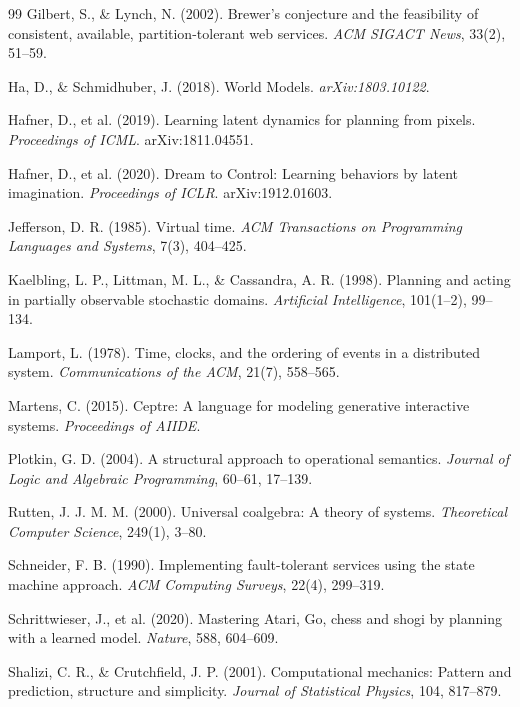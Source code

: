\documentclass[11pt]{article}
\begin{document}
\begin{thebibliography}{99}
 Gilbert, S., \& Lynch, N. (2002). Brewer's conjecture and the feasibility of consistent, available, partition-tolerant web services. \textit{ACM SIGACT News}, 33(2), 51--59.

 Ha, D., \& Schmidhuber, J. (2018). World Models. \textit{arXiv:1803.10122}.

 Hafner, D., et al. (2019). Learning latent dynamics for planning from pixels. \textit{Proceedings of ICML}. arXiv:1811.04551.

 Hafner, D., et al. (2020). Dream to Control: Learning behaviors by latent imagination. \textit{Proceedings of ICLR}. arXiv:1912.01603.

 Jefferson, D. R. (1985). Virtual time. \textit{ACM Transactions on Programming Languages and Systems}, 7(3), 404--425.

 Kaelbling, L. P., Littman, M. L., \& Cassandra, A. R. (1998). Planning and acting in partially observable stochastic domains. \textit{Artificial Intelligence}, 101(1--2), 99--134.

 Lamport, L. (1978). Time, clocks, and the ordering of events in a distributed system. \textit{Communications of the ACM}, 21(7), 558--565.

 Martens, C. (2015). Ceptre: A language for modeling generative interactive systems. \textit{Proceedings of AIIDE}.

 Plotkin, G. D. (2004). A structural approach to operational semantics. \textit{Journal of Logic and Algebraic Programming}, 60--61, 17--139.

 Rutten, J. J. M. M. (2000). Universal coalgebra: A theory of systems. \textit{Theoretical Computer Science}, 249(1), 3--80.

 Schneider, F. B. (1990). Implementing fault-tolerant services using the state machine approach. \textit{ACM Computing Surveys}, 22(4), 299--319.

 Schrittwieser, J., et al. (2020). Mastering Atari, Go, chess and shogi by planning with a learned model. \textit{Nature}, 588, 604--609.

 Shalizi, C. R., \& Crutchfield, J. P. (2001). Computational mechanics: Pattern and prediction, structure and simplicity. \textit{Journal of Statistical Physics}, 104, 817--879.


\end{thebibliography}
\end{document}
